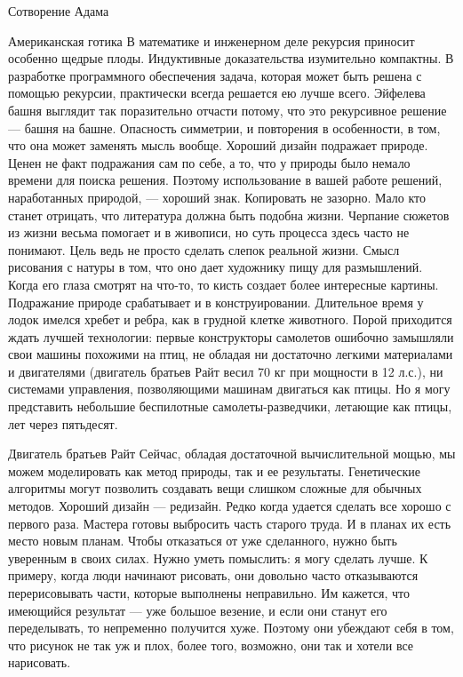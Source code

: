 \documentclass[ebook,12pt,oneside,openany]{memoir}
\begin{document}
Сотворение Адама

Американская готика В математике и инженерном деле рекурсия приносит
особенно щедрые плоды. Индуктивные доказательства изумительно
компактны. В разработке программного обеспечения задача, которая может
быть решена с помощью рекурсии, практически всегда решается ею лучше
всего. Эйфелева башня выглядит так поразительно отчасти потому, что
это рекурсивное решение — башня на башне. Опасность симметрии, и
повторения в особенности, в том, что она может заменять мысль вообще.
Хороший дизайн подражает природе. Ценен не факт подражания сам по
себе, а то, что у природы было немало времени для поиска решения.
Поэтому использование в вашей работе решений, наработанных природой, —
хороший знак. Копировать не зазорно. Мало кто станет отрицать, что
литература должна быть подобна жизни. Черпание сюжетов из жизни весьма
помогает и в живописи, но суть процесса здесь часто не понимают. Цель
ведь не просто сделать слепок реальной жизни. Смысл рисования с натуры
в том, что оно дает художнику пищу для размышлений. Когда его глаза
смотрят на что-то, то кисть создает более интересные картины.
Подражание природе срабатывает и в конструировании. Длительное время у
лодок имелся хребет и ребра, как в грудной клетке животного. Порой
приходится ждать лучшей технологии: первые конструкторы самолетов
ошибочно замышляли свои машины похожими на птиц, не обладая ни
достаточно легкими материалами и двигателями (двигатель братьев Райт
весил 70 кг при мощности в 12 л.с.), ни системами управления,
позволяющими машинам двигаться как птицы. Но я могу представить
небольшие беспилотные самолеты-разведчики, летающие как птицы, лет
через пятьдесят.

Двигатель братьев Райт Сейчас, обладая достаточной вычислительной
мощью, мы можем моделировать как метод природы, так и ее результаты.
Генетические алгоритмы могут позволить создавать вещи слишком сложные
для обычных методов. Хороший дизайн — редизайн. Редко когда удается
сделать все хорошо с первого раза. Мастера готовы выбросить часть
старого труда. И в планах их есть место новым планам. Чтобы отказаться
от уже сделанного, нужно быть уверенным в своих силах. Нужно уметь
помыслить: я могу сделать лучше. К примеру, когда люди начинают
рисовать, они довольно часто отказываются перерисовывать части,
которые выполнены неправильно. Им кажется, что имеющийся результат —
уже большое везение, и если они станут его переделывать, то непременно
получится хуже. Поэтому они убеждают себя в том, что рисунок не так уж
и плох, более того, возможно, они так и хотели все нарисовать.
\end{document}
